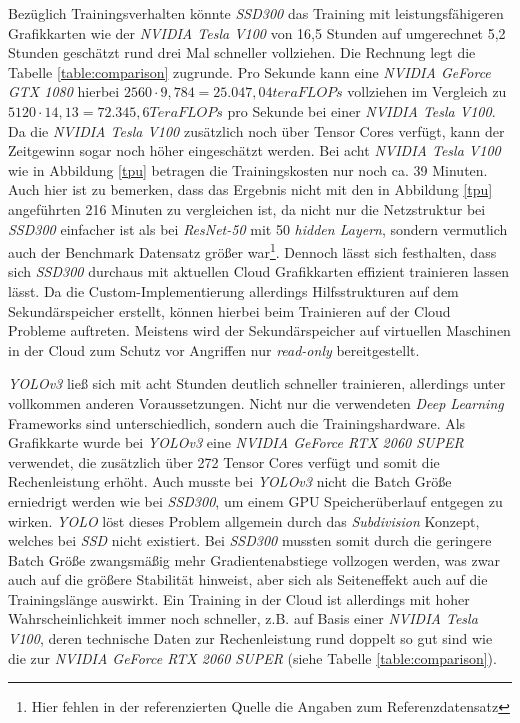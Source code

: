 Bezüglich Trainingsverhalten könnte \textit{SSD300} das Training mit leistungsfähigeren Grafikkarten wie der \textit{NVIDIA Tesla V100} von 16,5 Stunden auf umgerechnet 5,2 Stunden geschätzt rund drei Mal schneller vollziehen. Die Rechnung legt die Tabelle \ref{table:comparison} zugrunde. Pro Sekunde kann eine \textit{NVIDIA GeForce GTX 1080} hierbei $2560 \cdot 9,784 = 25.047,04 teraFLOPs$ vollziehen im Vergleich zu $5120 \cdot 14,13 = 72.345,6 TeraFLOPs$ pro Sekunde bei einer \textit{NVIDIA Tesla V100}. Da die \textit{NVIDIA Tesla V100} zusätzlich noch über Tensor Cores verfügt, kann der Zeitgewinn sogar noch höher eingeschätzt werden. Bei acht \textit{NVIDIA Tesla V100} wie in Abbildung \ref{tpu} betragen die Trainingskosten nur noch ca. 39 Minuten. Auch hier ist zu bemerken, dass das Ergebnis nicht mit den in Abbildung \ref{tpu} angeführten 216 Minuten zu vergleichen ist, da nicht nur die Netzstruktur bei \textit{SSD300} einfacher ist als bei \textit{ResNet-50} mit 50 \textit{hidden Layern}, sondern vermutlich auch der Benchmark Datensatz größer war\footnote{Hier fehlen in der referenzierten Quelle die Angaben zum Referenzdatensatz}. Dennoch lässt sich festhalten, dass sich \textit{SSD300} durchaus mit aktuellen Cloud Grafikkarten effizient trainieren lassen lässt. Da die Custom-Implementierung allerdings Hilfsstrukturen auf dem Sekundärspeicher erstellt, können hierbei beim Trainieren auf der Cloud Probleme auftreten. Meistens wird der Sekundärspeicher auf virtuellen Maschinen in der Cloud zum Schutz vor Angriffen nur \textit{read-only} bereitgestellt. 

\textit{YOLOv3} ließ sich mit acht Stunden deutlich schneller trainieren, allerdings unter vollkommen anderen Voraussetzungen. Nicht nur die verwendeten \textit{Deep Learning} Frameworks sind unterschiedlich, sondern auch die Trainingshardware. Als Grafikkarte wurde bei \textit{YOLOv3} eine \textit{NVIDIA GeForce RTX 2060 SUPER} verwendet, die zusätzlich über 272 Tensor Cores verfügt und somit die Rechenleistung erhöht. Auch musste bei \textit{YOLOv3} nicht die Batch Größe erniedrigt werden wie bei \textit{SSD300}, um einem GPU Speicherüberlauf entgegen zu wirken. \textit{YOLO} löst dieses Problem allgemein durch das \textit{Subdivision} Konzept, welches bei \textit{SSD} nicht existiert. Bei \textit{SSD300} mussten somit durch die geringere Batch Größe zwangsmäßig mehr Gradientenabstiege vollzogen werden, was zwar auch auf die größere Stabilität hinweist, aber sich als Seiteneffekt auch auf die Trainingslänge auswirkt. Ein Training in der Cloud ist allerdings mit hoher Wahrscheinlichkeit immer noch schneller, z.B. auf Basis einer \textit{NVIDIA Tesla V100}, deren technische Daten zur Rechenleistung rund doppelt so gut sind wie die zur \textit{NVIDIA GeForce RTX 2060 SUPER} (siehe Tabelle \ref{table:comparison}). 

